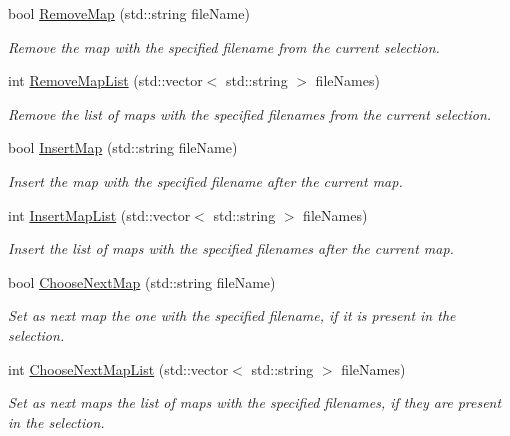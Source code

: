 \begin{DoxyCompactItemize}
bool \hyperlink{classMethods_a1fd515d35dfc0007303ff75c4f50a678}{Remove\-Map} (std\-::string file\-Name)
\begin{DoxyCompactList}\small\item\em Remove the map with the specified filename from the current selection. \end{DoxyCompactList}\item 
int \hyperlink{classMethods_afbac3687bfc17000689598bff14c7610}{Remove\-Map\-List} (std\-::vector$<$ std\-::string $>$ file\-Names)
\begin{DoxyCompactList}\small\item\em Remove the list of maps with the specified filenames from the current selection. \end{DoxyCompactList}\item 
bool \hyperlink{classMethods_a02eb54d04e3ea1970e5312f0aa061d28}{Insert\-Map} (std\-::string file\-Name)
\begin{DoxyCompactList}\small\item\em Insert the map with the specified filename after the current map. \end{DoxyCompactList}\item 
int \hyperlink{classMethods_a1b5d820d4715a10ab6dbb6bed1b28ec4}{Insert\-Map\-List} (std\-::vector$<$ std\-::string $>$ file\-Names)
\begin{DoxyCompactList}\small\item\em Insert the list of maps with the specified filenames after the current map. \end{DoxyCompactList}\item 
bool \hyperlink{classMethods_a8feb1efefe49126cf39089ff6a2f0cd9}{Choose\-Next\-Map} (std\-::string file\-Name)
\begin{DoxyCompactList}\small\item\em Set as next map the one with the specified filename, if it is present in the selection. \end{DoxyCompactList}\item 
int \hyperlink{classMethods_a7db232616b47d7afa1d3202bf156e624}{Choose\-Next\-Map\-List} (std\-::vector$<$ std\-::string $>$ file\-Names)
\begin{DoxyCompactList}\small\item\em Set as next maps the list of maps with the specified filenames, if they are present in the selection. \end{DoxyCompactList}\end{DoxyCompactItemize}
